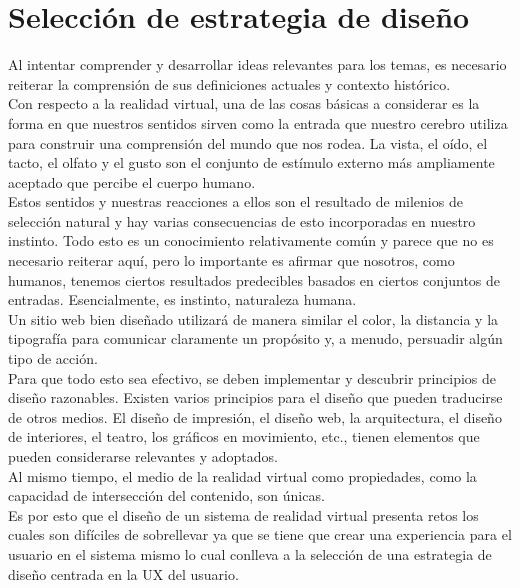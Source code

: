 \section{Selección de estrategia de diseño}
Al intentar comprender y desarrollar ideas relevantes para los temas, es necesario reiterar la comprensión de sus definiciones actuales y contexto histórico.\\
Con respecto a la realidad virtual, una de las cosas básicas a considerar es la forma en que nuestros sentidos sirven como la entrada que nuestro cerebro utiliza 
para construir una comprensión del mundo que nos rodea. La vista, el oído, el tacto, el olfato y el gusto son el conjunto de estímulo externo más ampliamente aceptado 
que percibe el cuerpo humano.\\
Estos sentidos y nuestras reacciones a ellos son el resultado de milenios de selección natural y hay varias consecuencias de esto incorporadas en nuestro instinto. 
Todo esto es un conocimiento relativamente común y parece que no es necesario reiterar aquí, pero lo importante es afirmar que nosotros, como humanos, tenemos ciertos 
resultados predecibles basados en ciertos conjuntos de entradas. Esencialmente, es instinto, naturaleza humana.\\
Un sitio web bien diseñado utilizará de manera similar el color, la distancia y la tipografía para comunicar claramente un propósito y, a menudo, persuadir algún tipo de acción.\\
Para que todo esto sea efectivo, se deben implementar y descubrir principios de diseño razonables. Existen varios principios para el diseño que pueden traducirse de otros medios. 
El diseño de impresión, el diseño web, la arquitectura, el diseño de interiores, el teatro, los gráficos en movimiento, etc., tienen elementos que pueden considerarse 
relevantes y adoptados. \cite{web18} \\
Al mismo tiempo, el medio de la realidad virtual como propiedades, como la capacidad de intersección del contenido, son únicas.\\
Es por esto que el diseño de un sistema de realidad virtual presenta retos los cuales son difíciles de sobrellevar ya que se tiene que crear una experiencia para el 
usuario en el sistema mismo lo cual conlleva a la selección de una estrategia de diseño centrada en la UX del usuario.

